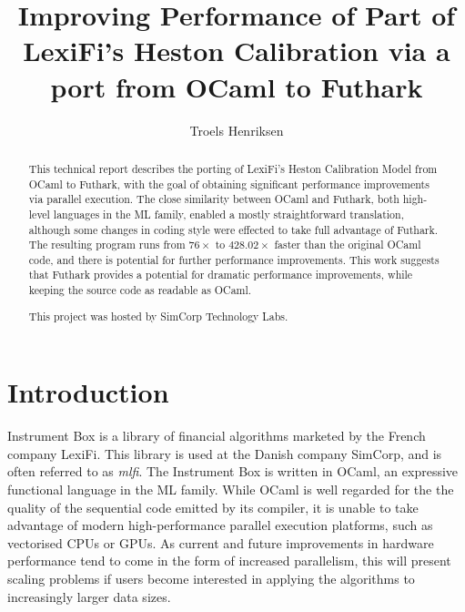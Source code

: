 \documentclass{article}
\title{Improving Performance of Part of LexiFi's Heston Calibration
  via a port from OCaml to Futhark}
\author{Troels Henriksen}
\begin{document}
\maketitle

  \begin{abstract}
    This technical report describes the porting of LexiFi's Heston
    Calibration Model from OCaml to Futhark, with the goal of
    obtaining significant performance improvements via parallel
    execution.  The close similarity between OCaml and Futhark, both
    high-level languages in the ML family, enabled a mostly
    straightforward translation, although some changes in coding style
    were effected to take full advantage of Futhark.  The resulting
    program runs from $76\times$ to $428.02\times$ faster than the
    original OCaml code, and there is potential for further
    performance improvements.  This work suggests that Futhark
    provides a potential for dramatic performance improvements, while
    keeping the source code as readable as OCaml.

    This project was hosted by SimCorp Technology Labs.
  \end{abstract}

\section{Introduction}

Instrument Box is a library of financial algorithms marketed by the
French company LexiFi.  This library is used at the Danish company
SimCorp, and is often referred to as \textit{mlfi}.  The Instrument
Box is written in OCaml, an expressive functional language in the ML
family.  While OCaml is well regarded for the the quality of the
sequential code emitted by its compiler, it is unable to take
advantage of modern high-performance parallel execution platforms,
such as vectorised CPUs or GPUs.  As current and future improvements
in hardware performance tend to come in the form of increased
parallelism, this will present scaling problems if users become
interested in applying the algorithms to increasingly larger data
sizes.
\end{document}
